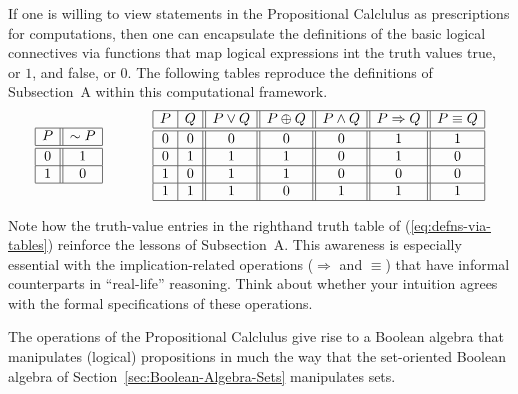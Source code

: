 \medskip

%
If one is willing to view statements in the Propositional Calclulus as
prescriptions for computations, then one can encapsulate the
definitions of the basic logical connectives via functions that map
logical expressions int the truth values {\small\sf true}, or $1$, and
{\small\sf false}, or $0$.  The following tables reproduce the
definitions of Subsection~A within this computational framework.
\begin{equation}
\label{eq:defns-via-tables}
\begin{array}{|c||c|}
\hline
P & \sim P \\
\hline
\hline
0 & 1 \\
\hline
1 & 0 \\
\hline
\end{array}
\hspace*{.5in}
\begin{array}{|c|c||c||c||c||c||c|}
\hline
P & Q & P \vee Q  & P \oplus Q & P \wedge Q & P \Rightarrow Q & P \equiv Q  \\
\hline
\hline
0 & 0 & 0 & 0 & 0 & 1 & 1 \\
\hline
0 & 1 & 1 & 1 & 0 & 1 & 0 \\
\hline
1 & 0 & 1 & 1 & 0 & 0 & 0 \\
\hline
1 & 1 & 1 & 0 & 1 & 1 & 1 \\
\hline
\end{array}
\end{equation}

Note how the truth-value entries in the righthand truth table of
(\ref{eq:defns-via-tables}) reinforce the lessons of Subsection~A.
This awareness is especially essential with the implication-related
operations ($\Rightarrow$ and $\equiv$) that have informal
counterparts in ``real-life'' reasoning.  Think about whether your
intuition agrees with the formal specifications of these operations.

\medskip

%
The operations of the Propositional Calclulus give rise to a Boolean
algebra that manipulates (logical) propositions in much the way that
the set-oriented Boolean algebra of
Section~\ref{sec:Boolean-Algebra-Sets} manipulates sets.

